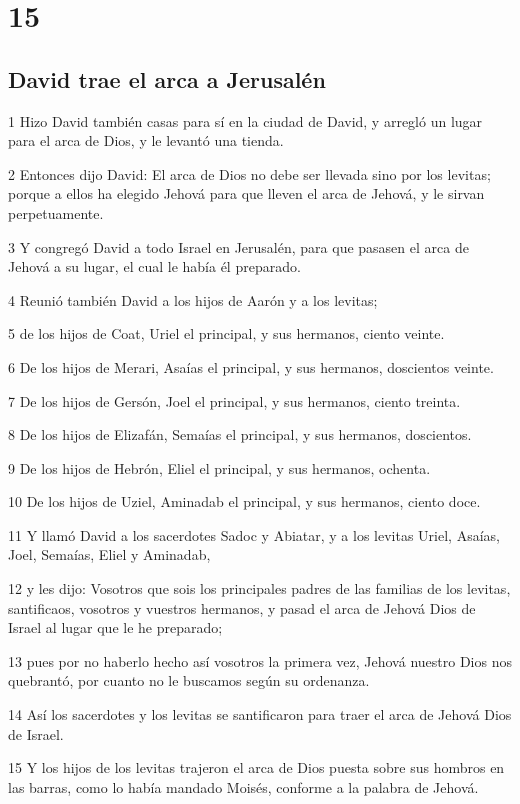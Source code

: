 \chapter{15}

\section*{David trae el arca a Jerusalén}

\par 1 Hizo David también casas para sí en la ciudad de David, y arregló un lugar para el arca de Dios, y le levantó una tienda.
\par 2 Entonces dijo David: El arca de Dios no debe ser llevada sino por los levitas; porque a ellos ha elegido Jehová para que lleven el arca de Jehová, y le sirvan perpetuamente. 
\par 3 Y congregó David a todo Israel en Jerusalén, para que pasasen el arca de Jehová a su lugar, el cual le había él preparado.
\par 4 Reunió también David a los hijos de Aarón y a los levitas;
\par 5 de los hijos de Coat, Uriel el principal, y sus hermanos, ciento veinte.
\par 6 De los hijos de Merari, Asaías el principal, y sus hermanos, doscientos veinte.
\par 7 De los hijos de Gersón, Joel el principal, y sus hermanos, ciento treinta.
\par 8 De los hijos de Elizafán, Semaías el principal, y sus hermanos, doscientos.
\par 9 De los hijos de Hebrón, Eliel el principal, y sus hermanos, ochenta.
\par 10 De los hijos de Uziel, Aminadab el principal, y sus hermanos, ciento doce.
\par 11 Y llamó David a los sacerdotes Sadoc y Abiatar, y a los levitas Uriel, Asaías, Joel, Semaías, Eliel y Aminadab,
\par 12 y les dijo: Vosotros que sois los principales padres de las familias de los levitas, santificaos, vosotros y vuestros hermanos, y pasad el arca de Jehová Dios de Israel al lugar que le he preparado;
\par 13 pues por no haberlo hecho así vosotros la primera vez, Jehová nuestro Dios nos quebrantó, por cuanto no le buscamos según su ordenanza.
\par 14 Así los sacerdotes y los levitas se santificaron para traer el arca de Jehová Dios de Israel.
\par 15 Y los hijos de los levitas trajeron el arca de Dios puesta sobre sus hombros en las barras, como lo había mandado Moisés, conforme a la palabra de Jehová. 
